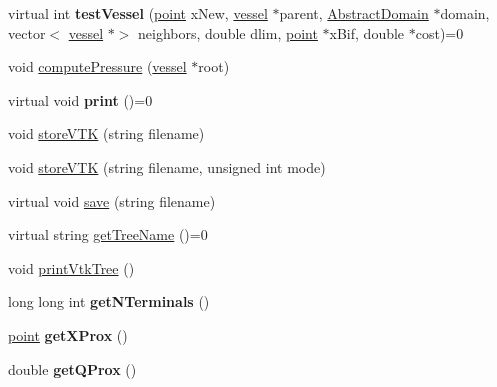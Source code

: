 \begin{DoxyCompactItemize}
\item 
\mbox{\label{class_abstract_c_c_o_tree_a3d13d93af07901a8186cecbc3b618f18}} 
virtual int {\bfseries test\+Vessel} (\mbox{\hyperlink{structpoint}{point}} x\+New, \mbox{\hyperlink{structvessel}{vessel}} $\ast$parent, \mbox{\hyperlink{class_abstract_domain}{Abstract\+Domain}} $\ast$domain, vector$<$ \mbox{\hyperlink{structvessel}{vessel}} $\ast$$>$ neighbors, double dlim, \mbox{\hyperlink{structpoint}{point}} $\ast$x\+Bif, double $\ast$cost)=0
\item 
void \mbox{\hyperlink{class_abstract_c_c_o_tree_ab16ad7522a75add6d9e44bbab0c70bf3}{compute\+Pressure}} (\mbox{\hyperlink{structvessel}{vessel}} $\ast$root)
\item 
\mbox{\label{class_abstract_c_c_o_tree_ac97ae2a27d8d386b9dfb862dbad5bb2f}} 
virtual void {\bfseries print} ()=0
\item 
void \mbox{\hyperlink{class_abstract_c_c_o_tree_a4971f9dcca23a0d0fbf3781535f13f43}{store\+V\+TK}} (string filename)
\item 
void \mbox{\hyperlink{class_abstract_c_c_o_tree_af1c9afa4526be184cb4cf0cb20d387b1}{store\+V\+TK}} (string filename, unsigned int mode)
\item 
virtual void \mbox{\hyperlink{class_abstract_c_c_o_tree_a9cc80ae6c23571710a3db688a6c1a3b0}{save}} (string filename)
\item 
virtual string \mbox{\hyperlink{class_abstract_c_c_o_tree_aa044337119c45985addba3ff7d554de2}{get\+Tree\+Name}} ()=0
\item 
void \mbox{\hyperlink{class_abstract_c_c_o_tree_a91dfce34a13f82208d0bf085304aef1b}{print\+Vtk\+Tree}} ()
\item 
\mbox{\label{class_abstract_c_c_o_tree_a6b9d40347abab4b807dc81070129922d}} 
long long int {\bfseries get\+N\+Terminals} ()
\item 
\mbox{\label{class_abstract_c_c_o_tree_ac7d61c6c465909b4d4e3affc2937b134}} 
\mbox{\hyperlink{structpoint}{point}} {\bfseries get\+X\+Prox} ()
\item 
\mbox{\label{class_abstract_c_c_o_tree_a2e8d3a219f7b186438ecb52ad73931ff}} 
double {\bfseries get\+Q\+Prox} ()
\item 
$$
\end{DoxyCompactItemize}
